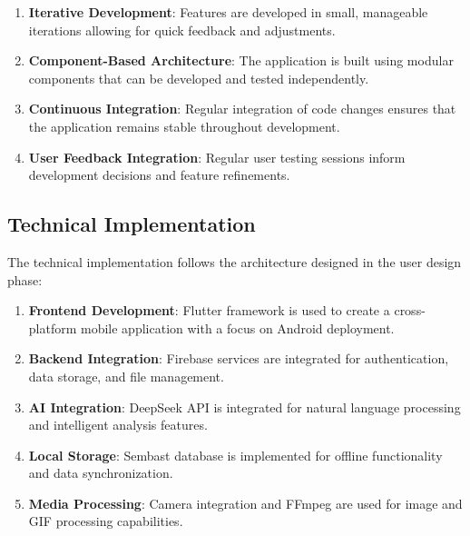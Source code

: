 \begin{enumerate}
    \item \textbf{Iterative Development}: Features are developed in small, manageable iterations allowing for quick feedback and adjustments.
    
    \item \textbf{Component-Based Architecture}: The application is built using modular components that can be developed and tested independently.
    
    \item \textbf{Continuous Integration}: Regular integration of code changes ensures that the application remains stable throughout development.
    
    \item \textbf{User Feedback Integration}: Regular user testing sessions inform development decisions and feature refinements.
\end{enumerate}

\subsection{Technical Implementation}\label{subsec:technicalImplementation}

The technical implementation follows the architecture designed in the user design phase:

\begin{enumerate}
    \item \textbf{Frontend Development}: Flutter framework is used to create a cross-platform mobile application with a focus on Android deployment.
    
    \item \textbf{Backend Integration}: Firebase services are integrated for authentication, data storage, and file management.
    
    \item \textbf{AI Integration}: DeepSeek API is integrated for natural language processing and intelligent analysis features.
    
    \item \textbf{Local Storage}: Sembast database is implemented for offline functionality and data synchronization.
    
    \item \textbf{Media Processing}: Camera integration and FFmpeg are used for image and GIF processing capabilities.
\end{enumerate}

